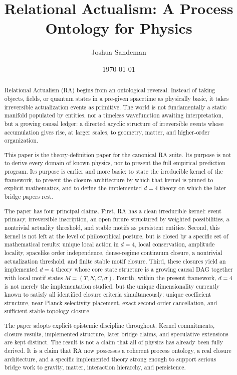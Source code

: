 \documentclass[11pt]{article}
\title{Relational Actualism: A Process Ontology for Physics}
\author{Joshua Sandeman}
\date{\today}
\begin{document}
\maketitle

\begin{abstract}
Relational Actualism (RA) begins from an ontological reversal. Instead of taking objects, fields, or quantum states in a pre-given spacetime as physically basic, it takes irreversible actualization events as primitive. The world is not fundamentally a static manifold populated by entities, nor a timeless wavefunction awaiting interpretation, but a growing causal ledger: a directed acyclic structure of irreversible events whose accumulation gives rise, at larger scales, to geometry, matter, and higher-order organization.

This paper is the theory-definition paper for the canonical RA suite. Its purpose is not to derive every domain of known physics, nor to present the full empirical prediction program. Its purpose is earlier and more basic: to state the irreducible kernel of the framework, to present the closure architecture by which that kernel is pinned to explicit mathematics, and to define the implemented $d=4$ theory on which the later bridge papers rest.

The paper has four principal claims. First, RA has a clean irreducible kernel: event primacy, irreversible inscription, an open future structured by weighted possibilities, a nontrivial actuality threshold, and stable motifs as persistent entities. Second, this kernel is not left at the level of philosophical posture, but is closed by a specific set of mathematical results: unique local action in $d=4$, local conservation, amplitude locality, spacelike order independence, dense-regime continuum closure, a nontrivial actualization threshold, and finite stable motif closure. Third, these closures yield an implemented $d=4$ theory whose core state structure is a growing causal DAG together with local motif states $M=(T,N,C,\sigma)$. Fourth, within the present framework, $d=4$ is not merely the implementation studied, but the unique dimensionality currently known to satisfy all identified closure criteria simultaneously: unique coefficient structure, near-Planck selectivity placement, exact second-order cancellation, and sufficient stable topology closure.

The paper adopts explicit epistemic discipline throughout. Kernel commitments, closure results, implemented structure, later bridge claims, and speculative extensions are kept distinct. The result is not a claim that all of physics has already been fully derived. It is a claim that RA now possesses a coherent process ontology, a real closure architecture, and a specific implemented theory strong enough to support serious bridge work to gravity, matter, interaction hierarchy, and persistence.
\end{abstract}
\end{document}
